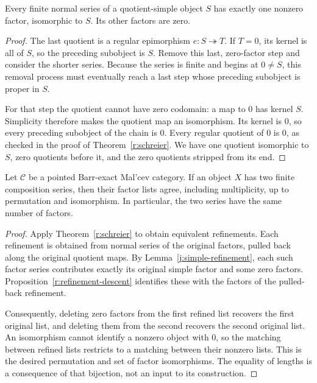 \begin{lemma}
\label{j:simple-refinement}
Every finite normal series of a quotient-simple object $S$ has exactly
one nonzero factor, isomorphic to $S$.  Its other factors are zero.
\end{lemma}

\begin{proof}
The last quotient is a regular epimorphism $e:S\twoheadrightarrow T$.
If $T=0$, its kernel is all of $S$, so the preceding subobject is $S$.
Remove this last, zero-factor step and consider the shorter series.
Because the series is finite and begins at $0\neq S$, this removal
process must eventually reach a last step whose preceding subobject is
proper in $S$.

For that step the quotient cannot have zero codomain: a map to $0$ has
kernel $S$.  Simplicity therefore makes the quotient map an isomorphism.
Its kernel is $0$, so every preceding subobject of the chain is $0$.
Every regular quotient of $0$ is $0$, as checked in the proof of
Theorem~\ref{r:schreier}.  We have one quotient isomorphic to $S$, zero
quotients before it, and the zero quotients stripped from its end.
\end{proof}

\begin{theorem}
\label{j:jordan-holder}
Let $\mathcal C$ be a pointed Barr-exact Mal'cev category.  If an object
$X$ has two finite composition series, then their factor lists agree,
including multiplicity, up to permutation and isomorphism.  In particular,
the two series have the same number of factors.
\end{theorem}

\begin{proof}
Apply Theorem~\ref{r:schreier} to obtain equivalent refinements.  Each
refinement is obtained from normal series of the original factors, pulled
back along the original quotient maps.  By Lemma~\ref{j:simple-refinement},
each such factor series contributes exactly its original simple factor
and some zero factors.  Proposition~\ref{r:refinement-descent} identifies
these with the factors of the pulled-back refinement.

Consequently, deleting zero factors from the first refined list recovers
the first original list, and deleting them from the second recovers the
second original list.  An isomorphism cannot identify a nonzero object
with $0$, so the matching between refined lists restricts to a matching
between their nonzero lists.  This is the desired permutation and set of
factor isomorphisms.  The equality of lengths is a consequence of that
bijection, not an input to its construction.
\end{proof}

